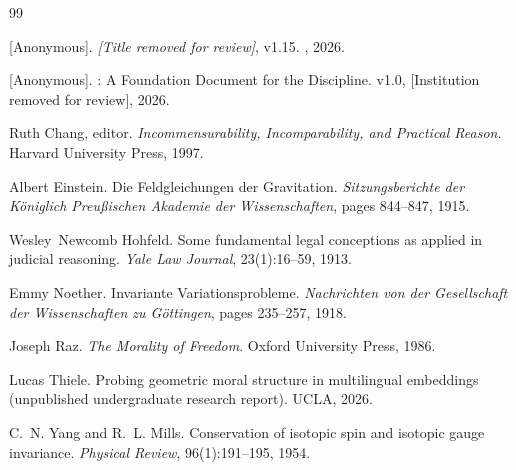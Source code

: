\documentclass[12pt]{article}
\theoremstyle{definition}
\theoremstyle{remark}
\begin{document}
\begin{thebibliography}{99}

[Anonymous].
\newblock \emph{[Title removed for review]}, v1.15.
, 2026.

[Anonymous].
: A Foundation Document for the Discipline.
\newblock v1.0, [Institution removed for review], 2026.

Ruth Chang, editor.
\newblock \emph{Incommensurability, Incomparability, and Practical Reason}.
\newblock Harvard University Press, 1997.

Albert Einstein.
\newblock Die Feldgleichungen der Gravitation.
\newblock \emph{Sitzungsberichte der K\"{o}niglich Preu{\ss}ischen Akademie der Wissenschaften}, pages 844--847, 1915.

Wesley~Newcomb Hohfeld.
\newblock Some fundamental legal conceptions as applied in judicial reasoning.
\newblock \emph{Yale Law Journal}, 23(1):16--59, 1913.

Emmy Noether.
\newblock Invariante Variationsprobleme.
\newblock \emph{Nachrichten von der Gesellschaft der Wissenschaften zu G\"{o}ttingen}, pages 235--257, 1918.

Joseph Raz.
\newblock \emph{The Morality of Freedom}.
\newblock Oxford University Press, 1986.

Lucas Thiele.
\newblock Probing geometric moral structure in multilingual embeddings (unpublished undergraduate research report).
\newblock UCLA, 2026.

C.~N. Yang and R.~L. Mills.
\newblock Conservation of isotopic spin and isotopic gauge invariance.
\newblock \emph{Physical Review}, 96(1):191--195, 1954.

\end{thebibliography}
\end{document}
